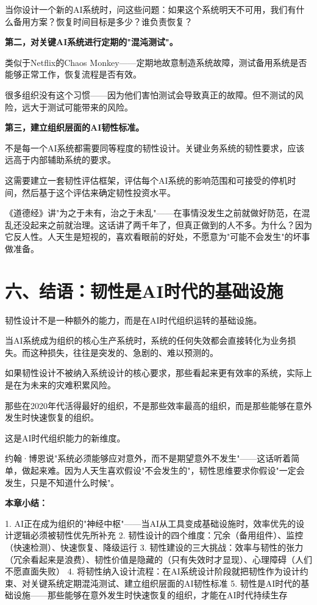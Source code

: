 当你设计一个新的AI系统时，问这些问题：如果这个系统明天不可用，我们有什么备用方案？恢复时间目标是多少？谁负责恢复？

\textbf{第二，对关键AI系统进行定期的"混沌测试"。}

类似于Netflix的Chaos Monkey——定期地故意制造系统故障，测试备用系统是否能够正常工作，恢复流程是否有效。

很多组织没有这个习惯——因为他们害怕测试会导致真正的故障。但不测试的风险，远大于测试可能带来的风险。

\textbf{第三，建立组织层面的AI韧性标准。}

不是每一个AI系统都需要同等程度的韧性设计。关键业务系统的韧性要求，应该远高于内部辅助系统的要求。

这需要建立一套韧性评估框架，评估每个AI系统的影响范围和可接受的停机时间，然后基于这个评估来确定韧性投资水平。

《道德经》讲"为之于未有，治之于未乱"——在事情没发生之前就做好防范，在混乱还没起来之前就治理。这话讲了两千年了，但真正做到的人不多。为什么？因为它反人性。人天生是短视的，喜欢看眼前的好处，不愿意为"可能不会发生"的坏事做准备。

\section{六、结语：韧性是AI时代的基础设施}


韧性设计不是一种额外的能力，而是在AI时代组织运转的基础设施。

当AI系统成为组织的核心生产系统时，系统的任何失效都会直接转化为业务损失。而这种损失，往往是突发的、急剧的、难以预测的。

如果韧性设计不被纳入系统设计的核心要求，那些看起来更有效率的系统，实际上是在为未来的灾难积累风险。

那些在2020年代活得最好的组织，不是那些效率最高的组织，而是那些能够在意外发生时快速恢复的组织。

这是AI时代组织能力的新维度。

约翰·博恩说"系统必须能够应对意外，而不是期望意外不发生"——这话听着简单，做起来难。因为人天生喜欢假设"不会发生的"，韧性思维要求你假设"一定会发生，只是不知道什么时候"。


\textbf{本章小结：}

1. AI正在成为组织的"神经中枢"——当AI从工具变成基础设施时，效率优先的设计逻辑必须被韧性优先所补充
2. 韧性设计的四个维度：冗余（备用组件）、监控（快速检测）、快速恢复、降级运行
3. 韧性建设的三大挑战：效率与韧性的张力（冗余看起来是浪费）、韧性价值是隐藏的（只有失效时才显现）、心理障碍（人们不愿直面失败）
4. 将韧性纳入设计流程：在AI系统设计阶段就把韧性作为设计约束、对关键系统定期混沌测试、建立组织层面的AI韧性标准
5. 韧性是AI时代的基础设施——那些能够在意外发生时快速恢复的组织，才能在AI时代持续生存
